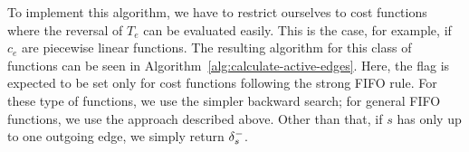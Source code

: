To implement this algorithm, we have to restrict ourselves to cost functions where the reversal of $T_e$ can be evaluated easily.
This is the case, for example, if $c_e$ are piecewise linear functions.
The resulting algorithm for this class of functions can be seen in Algorithm~\ref{alg:calculate-active-edges}.
Here, the flag  is expected to be set only for cost functions following the strong FIFO rule.
For these type of functions, we use the simpler backward search; for  general FIFO functions, we use the approach described above.
Other than that, if $s$ has only up to one outgoing edge, we simply return $\delta^-_{s}$.

